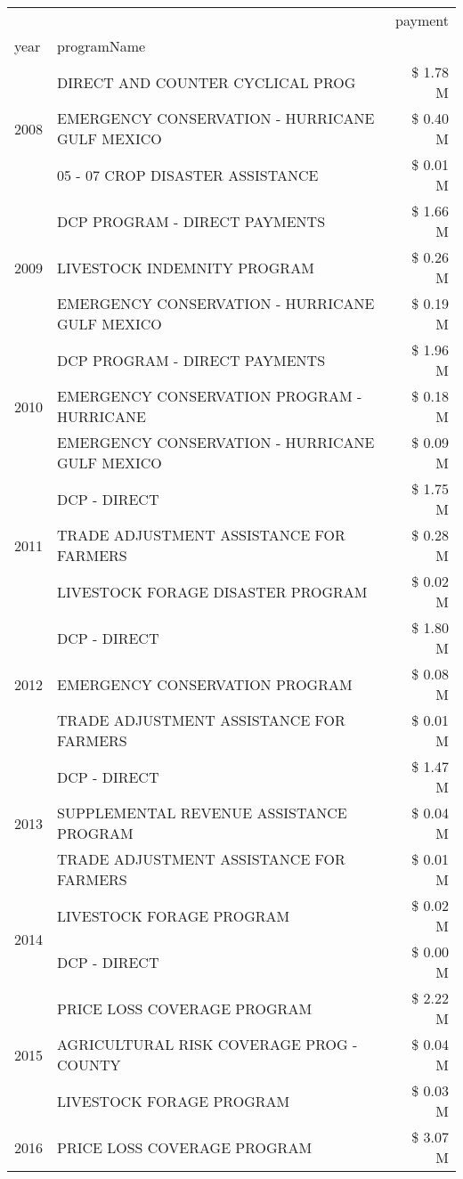 \begin{tabular}{llr}
\toprule
 &  & payment \\
year & programName &  \\
\midrule
\multirow[t]{3}{*}{2008} & DIRECT AND COUNTER CYCLICAL PROG & \$ 1.78 M \\
 & EMERGENCY CONSERVATION - HURRICANE GULF MEXICO & \$ 0.40 M \\
 & 05 - 07 CROP DISASTER ASSISTANCE & \$ 0.01 M \\
\cline{1-3}
\multirow[t]{3}{*}{2009} & DCP PROGRAM - DIRECT PAYMENTS & \$ 1.66 M \\
 & LIVESTOCK INDEMNITY PROGRAM & \$ 0.26 M \\
 & EMERGENCY CONSERVATION - HURRICANE GULF MEXICO & \$ 0.19 M \\
\cline{1-3}
\multirow[t]{3}{*}{2010} & DCP PROGRAM - DIRECT PAYMENTS & \$ 1.96 M \\
 & EMERGENCY CONSERVATION PROGRAM - HURRICANE & \$ 0.18 M \\
 & EMERGENCY CONSERVATION - HURRICANE GULF MEXICO & \$ 0.09 M \\
\cline{1-3}
\multirow[t]{3}{*}{2011} & DCP - DIRECT & \$ 1.75 M \\
 & TRADE ADJUSTMENT ASSISTANCE FOR FARMERS & \$ 0.28 M \\
 & LIVESTOCK FORAGE DISASTER PROGRAM & \$ 0.02 M \\
\cline{1-3}
\multirow[t]{3}{*}{2012} & DCP - DIRECT & \$ 1.80 M \\
 & EMERGENCY CONSERVATION PROGRAM & \$ 0.08 M \\
 & TRADE ADJUSTMENT ASSISTANCE FOR FARMERS & \$ 0.01 M \\
\cline{1-3}
\multirow[t]{3}{*}{2013} & DCP - DIRECT & \$ 1.47 M \\
 & SUPPLEMENTAL REVENUE ASSISTANCE PROGRAM & \$ 0.04 M \\
 & TRADE ADJUSTMENT ASSISTANCE FOR FARMERS & \$ 0.01 M \\
\cline{1-3}
\multirow[t]{2}{*}{2014} & LIVESTOCK FORAGE PROGRAM & \$ 0.02 M \\
 & DCP - DIRECT & \$ 0.00 M \\
\cline{1-3}
\multirow[t]{3}{*}{2015} & PRICE LOSS COVERAGE PROGRAM & \$ 2.22 M \\
 & AGRICULTURAL RISK COVERAGE PROG - COUNTY & \$ 0.04 M \\
 & LIVESTOCK FORAGE PROGRAM & \$ 0.03 M \\
\cline{1-3}
\multirow[t]{3}{*}{2016} & PRICE LOSS COVERAGE PROGRAM & \$ 3.07 M \\

\end{tabular}
